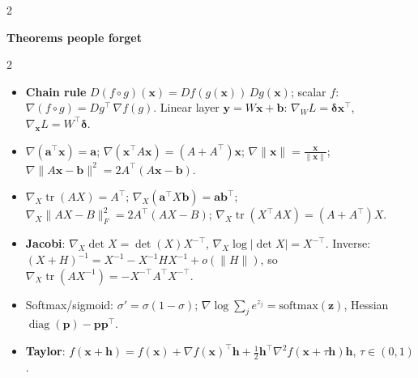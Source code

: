 \documentclass[10pt]{article}
\newcommand{\norm}[1]{\lVert #1 \rVert}
\DeclareMathOperator{\tr}{tr}
\DeclareMathOperator{\diag}{diag}
\newcommand{\topic}[1]{\par\smallskip\noindent{\color{blue!50!black}\textbf{#1}}\par\nopagebreak}
\newcommand{\head}[1]{\begin{center}\colorbox{blue!10}{\parbox{0.96\linewidth}{\centering\textbf{#1}}}\end{center}}
\begin{document}
\begin{multicols}{2}
\end{multicols}

\head{Theorems people forget}

\begin{multicols}{2}

\topic{Derivatives}
\begin{itemize}
    \item \textbf{Chain rule} $D(f \circ g)(\mathbf{x}) = Df(g(\mathbf{x}))\,Dg(\mathbf{x})$; scalar $f$: $\nabla(f \circ g) = Dg^\top\,\nabla f(g)$. Linear layer $\mathbf{y} = W\mathbf{x} + \mathbf{b}$: $\nabla_W L = \boldsymbol\delta\mathbf{x}^\top$, $\nabla_{\mathbf{x}}L = W^\top\boldsymbol\delta$.
    \item $\nabla(\mathbf{a}^\top\mathbf{x}) = \mathbf{a}$; $\nabla(\mathbf{x}^\top A\mathbf{x}) = (A + A^\top)\mathbf{x}$; $\nabla\norm{\mathbf{x}} = \frac{\mathbf{x}}{\norm{\mathbf{x}}}$; $\nabla\norm{A\mathbf{x} - \mathbf{b}}^2 = 2A^\top(A\mathbf{x} - \mathbf{b})$.
    \item $\nabla_X\tr(AX) = A^\top$; $\nabla_X(\mathbf{a}^\top X\mathbf{b}) = \mathbf{a}\mathbf{b}^\top$; $\nabla_X\norm{AX - B}_F^2 = 2A^\top(AX - B)$; $\nabla_X\tr(X^\top AX) = (A + A^\top)X$.
    \item \textbf{Jacobi}: $\nabla_X\det X = \det(X)X^{-\top}$, $\nabla_X\log|\det X| = X^{-\top}$. Inverse: $(X + H)^{-1} = X^{-1} - X^{-1}HX^{-1} + o(\norm{H})$, so $\nabla_X\tr(AX^{-1}) = -X^{-\top}A^\top X^{-\top}$.
    \item Softmax/sigmoid: $\sigma' = \sigma(1 - \sigma)$; $\nabla\log\sum_j e^{z_j} = \mathrm{softmax}(\mathbf{z})$, Hessian $\diag(\mathbf{p}) - \mathbf{p}\mathbf{p}^\top$.
    \item \textbf{Taylor}: $f(\mathbf{x} + \mathbf{h}) = f(\mathbf{x}) + \nabla f(\mathbf{x})^\top\mathbf{h} + \frac{1}{2}\mathbf{h}^\top\nabla^2 f(\mathbf{x} + \tau\mathbf{h})\mathbf{h}$, $\tau \in (0, 1)$.
\end{itemize}


\end{multicols}
\end{document}
